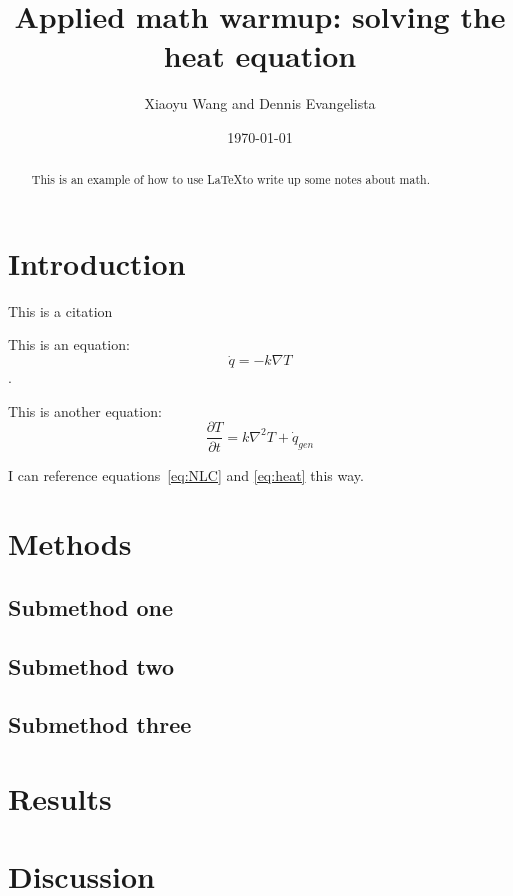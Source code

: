 \documentclass{amsart}
\title{Applied math warmup: solving the heat equation}
\author{Xiaoyu Wang and Dennis Evangelista}
\date{\today}
\begin{document}
\begin{abstract}
This is an example of how to use \LaTeX to write up some notes about math. 
\end{abstract}
\maketitle
\tableofcontents

\section{Introduction}
This is a citation \cite{Baker:2012}

This is an equation:
\begin{equation}
\dot{q} = - k \nabla T
\label{eq:NLC}
\end{equation}.

This is another equation:
\begin{equation}
\frac{\partial T}{\partial t} = 
k \nabla^2 T + \dot{q}_{gen}
\label{eq:heat}
\end{equation}

I can reference equations~\ref{eq:NLC} and \ref{eq:heat} this way. 

\section{Methods}
\subsection{Submethod one}
\subsection{Submethod two}
\subsection{Submethod three}

\section{Results}
\section{Discussion}



\end{document}

